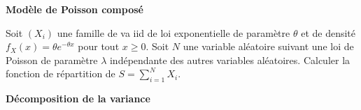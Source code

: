 \documentclass[11pt, addpoints, answers]{exam}
\begin{document}
\begin{questions}
\question \textbf{Modèle de Poisson composé}

Soit $(X_{i})$ une famille de va iid de loi exponentielle de paramètre $\theta$ et de densité $f_{X}(x) = \theta e^{- \theta x}$ pour tout $x \geq 0$. Soit $N$ une variable aléatoire suivant une loi de Poisson de paramètre $\lambda$ indépendante des autres variables aléatoires. Calculer la fonction de répartition de $S = \sum_{i=1}^{N} X_{i}$.


\question \textbf{Décomposition de la variance}




\end{questions}




\renewcommand\arraystretch{3.5}
\end{document}
